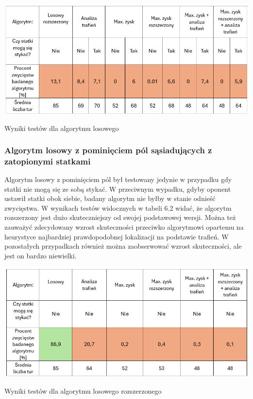 \begin{table}[!h]
    \centering
    \includegraphics[width=1\linewidth]{img/table-random.png}
    \caption{Wyniki testów dla algorytmu losowego}
\end{table}

\subsubsection{Algorytm losowy z pominięciem pól sąsiadujących z zatopionymi statkami}

Algorytm losowy z pominięciem pól był testowany jedynie w przypadku gdy statki nie mogą się ze sobą stykać. W przeciwnym wypadku, gdyby oponent ustawił statki obok siebie, badany algorytm nie byłby w stanie odnieść zwycięstwa. W wynikach testów widocznych w tabeli 6.2 widać, że algorytm rozszerzony jest dużo skuteczniejszy od swojej podstawowej wersji. Można też zauważyć zdecydowany wzrost skuteczności przeciwko algorytmowi opartemu na heurystyce najbardziej prawdopodobnej lokalizacji na podstawie trafień. W pozostałych przypadkach również można zaobserwować wzrost skuteczności, ale jest on bardzo niewielki.

\begin{table}[!h]
    \centering
    \includegraphics[width=1\linewidth]{img/table-random-plus.png}
    \caption{Wyniki testów dla algorytmu losowego rozszerzonego}
\end{table}

